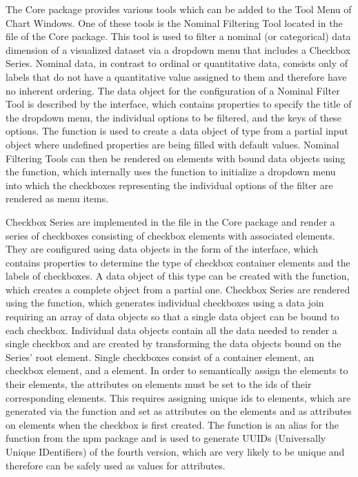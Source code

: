 The Core package provides various tools which can be added to the Tool
Menu of Chart Windows. One of these tools is the Nominal Filtering
Tool located in the  file of the
Core package. This tool is used to filter a nominal (or categorical)
data dimension of a visualized dataset via a dropdown menu that
includes a Checkbox Series. Nominal data, in contrast to ordinal or
quantitative data, consists only of labels that do not have a
quantitative value assigned to them and therefore have no inherent
ordering. The data object for the configuration of a Nominal Filter
Tool is described by the  interface, which
contains properties to specify the title of the dropdown menu, the
individual options to be filtered, and the keys of these options. The
 function is used to create a data object
of type  from a partial input object where
undefined properties are being filled with default values. Nominal
Filtering Tools can then be rendered on elements with bound
 data objects using the
 function, which internally uses the
 function to initialize a dropdown menu into
which the checkboxes representing the individual options of the filter
are rendered as menu items.

Checkbox Series are implemented in the  file
in the Core package and render a series of checkboxes consisting of
checkbox  elements with associated 
elements. They are configured using data objects in the form of the
 interface, which contains properties to
determine the type of checkbox container elements and the labels of
checkboxes. A data object of this type can be created with the
 function, which creates a complete object
from a partial one. Checkbox Series are rendered using the
 function, which generates individual
checkboxes using a data join requiring an array of 
data objects so that a single data object can be bound to each
checkbox. Individual  data objects contain all the data
needed to render a single checkbox and are created by transforming the
 data objects bound on the Series' root element.
Single checkboxes consist of a container element, an 
checkbox element, and a  element. In order to
semantically assign the  elements to their
 elements, the  attributes on 
elements must be set to the ids of their corresponding 
elements. This requires assigning unique ids to 
elements, which are generated via the  function and set as
 attributes on the  elements and as 
attributes on  elements when the checkbox is first
created. The  function is an alias for the 
function from the  npm package \parencite{UUIDPackage} and
is used to generate UUIDs (Universally Unique IDentifiers)
\parencite{UUIDRFC} of the fourth version, which are very likely to be
unique and therefore can be safely used as values for 
attributes.


